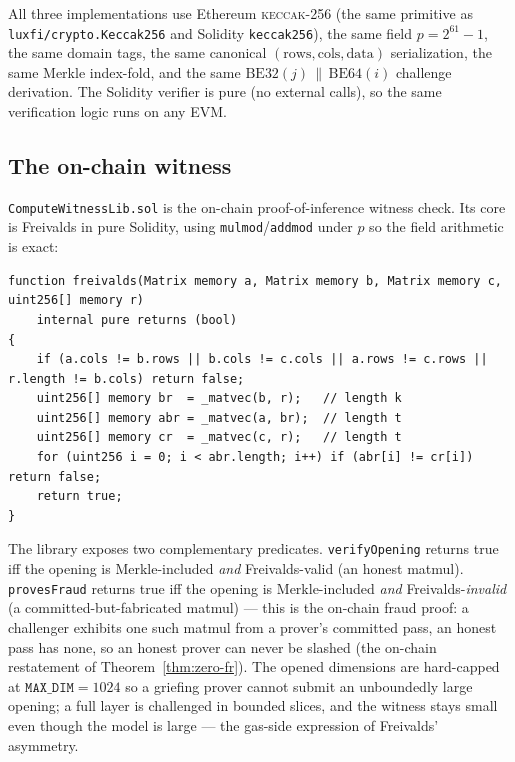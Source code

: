 \documentclass[11pt,a4paper]{article}
\begin{document}
All three implementations use Ethereum \textsc{keccak}-256 (the same primitive as \texttt{luxfi/crypto.Keccak256} and Solidity \texttt{keccak256}), the same field $p = 2^{61}-1$, the same domain tags, the same canonical $(\text{rows},\text{cols},\text{data})$ serialization, the same Merkle index-fold, and the same $\mathrm{BE32}(j)\,\|\,\mathrm{BE64}(i)$ challenge derivation. The Solidity verifier is pure (no external calls), so the same verification logic runs on any EVM.

\subsection{The on-chain witness}\label{sec:witness}

\texttt{ComputeWitnessLib.sol} is the on-chain proof-of-inference witness check. Its core is Freivalds in pure Solidity, using \texttt{mulmod}/\texttt{addmod} under $p$ so the field arithmetic is exact:

\begin{lstlisting}[language=Solidity,caption={Freivalds over $\mathbb{F}_p$ on-chain (\texttt{ComputeWitnessLib.sol}).}]
function freivalds(Matrix memory a, Matrix memory b, Matrix memory c, uint256[] memory r)
    internal pure returns (bool)
{
    if (a.cols != b.rows || b.cols != c.cols || a.rows != c.rows || r.length != b.cols) return false;
    uint256[] memory br  = _matvec(b, r);   // length k
    uint256[] memory abr = _matvec(a, br);  // length t
    uint256[] memory cr  = _matvec(c, r);   // length t
    for (uint256 i = 0; i < abr.length; i++) if (abr[i] != cr[i]) return false;
    return true;
}
\end{lstlisting}

The library exposes two complementary predicates. \texttt{verifyOpening} returns true iff the opening is Merkle-included \emph{and} Freivalds-valid (an honest matmul). \texttt{provesFraud} returns true iff the opening is Merkle-included \emph{and} Freivalds-\emph{invalid} (a committed-but-fabricated matmul) --- this is the on-chain fraud proof: a challenger exhibits one such matmul from a prover's committed pass, an honest pass has none, so an honest prover can never be slashed (the on-chain restatement of Theorem~\ref{thm:zero-fr}). The opened dimensions are hard-capped at $\texttt{MAX\_DIM} = 1024$ so a griefing prover cannot submit an unboundedly large opening; a full layer is challenged in bounded slices, and the witness stays small even though the model is large --- the gas-side expression of Freivalds' asymmetry.
\end{document}
